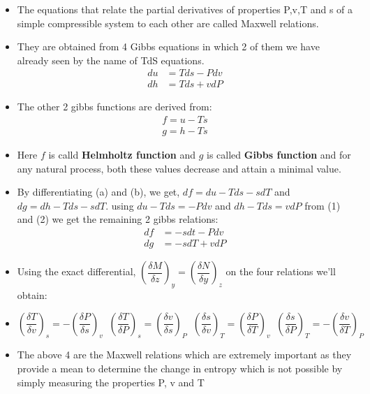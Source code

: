 \documentclass[8pt]{article}
\begin{document}
	\begin{itemize}
		\item The equations that relate the partial derivatives of properties P,v,T and s of a simple compressible system to each other are called Maxwell relations. 
		\item They are obtained from 4 Gibbs equations in which 2 of them we have already seen by the name of TdS equations. 
			\begin{align}
				du &= Tds - Pdv\\
				dh &= Tds + vdP
			\end{align}
		\item The other 2 gibbs functions are derived from:
			\begin{align}
			 	f = u - Ts \tag{a}\\
			 	g = h - Ts \tag{b}
			\end{align}
		\item Here $f$ is calld \textbf{Helmholtz function} and $g$ is called \textbf{Gibbs function} and for any natural process, both these values decrease and attain a minimal value.
		\item By differentiating (a) and (b), we get, $df = du - Tds - sdT$ and $dg = dh - Tds - sdT$. using $du - Tds = -Pdv$ and $dh - Tds = vdP$ from (1) and (2) we get the remaining 2 gibbs relations:
		\begin{align}
			df &= -sdt -Pdv\\
			dg &= -sdT + vdP
		\end{align}
		\item Using the exact differential, $\left(\dfrac{\delta M}{\delta z}\right)_y = \left(\dfrac{\delta N}{\delta y}\right)_z$ on the four relations we'll obtain:
		\item $\boxed{\left(\dfrac{\delta T}{\delta v}\right)_s = -\left(\dfrac{\delta P}{\delta s}\right)_v}\;\;  \boxed{\left(\dfrac{\delta T}{\delta P}\right)_s = \left(\dfrac{\delta v}{\delta s}\right)_P}\;\;  \boxed{\left(\dfrac{\delta s}{\delta v}\right)_T = \left(\dfrac{\delta P}{\delta T}\right)_v}\;\;  \boxed{\left(\dfrac{\delta s}{\delta P}\right)_T = -\left(\dfrac{\delta v}{\delta T}\right)_P}$
		\item The above 4 are the Maxwell relations which are extremely important as they provide a mean to determine the change in entropy which is not possible by simply measuring the properties P, v and T
	\end{itemize}\hrulefill\\\\
\end{document}

